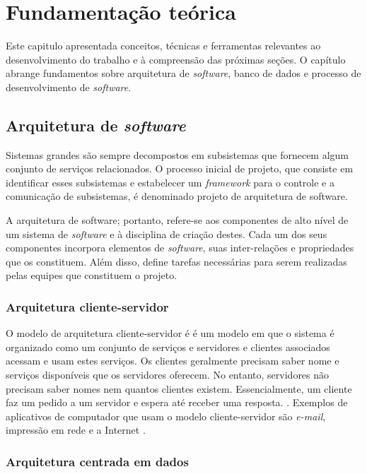 \chapter{Fundamentação teórica}

Este capitulo apresentada conceitos, técnicas e ferramentas relevantes ao desenvolvimento
do trabalho e à compreensão das próximas seções. O capítulo abrange fundamentos sobre arquitetura de \textit{software}, banco de dados e processo de desenvolvimento de \textit{software}.

\section{Arquitetura de \textit{software}}
\label{fundArquietura}

Sistemas grandes são sempre decompostos em subsistemas que fornecem algum conjunto de serviços relacionados. O processo inicial de projeto, que consiste em identificar esses subsistemas e estabelecer um \textit{framework} para o controle e a comunicação de subsistemas, é denominado projeto de arquitetura de software. \cite{sommerville}

A arquitetura de software; portanto, refere-se aos componentes de alto nível de um sistema de \textit{software} e à disciplina de criação destes. Cada um dos seus componentes incorpora elementos de \textit{software}, suas inter-relações e propriedades que os constituem. Além disso, define tarefas necessárias para serem realizadas pelas equipes que constituem o projeto.


\subsection{Arquitetura cliente-servidor}
\label{arquiteturaCentralizadaDados}

O modelo de arquitetura cliente-servidor é é um modelo em que o sistema é organizado como um conjunto de serviços e servidores e clientes associados acessam e usam estes serviços. Os clientes geralmente precisam saber nome e serviços disponíveis que os servidores oferecem. No entanto, servidores não precisam saber nomes nem quantos clientes existem. Essencialmente, um cliente faz um pedido a um servidor e espera até receber uma resposta. \cite{pressman}. Exemplos de aplicativos de computador que usam o modelo cliente-servidor são \textit{e-mail}, impressão em rede e a Internet \cite{kurose}.


\subsection{Arquitetura centrada em dados}
\label{arquiteturaCentralizadaDados}

